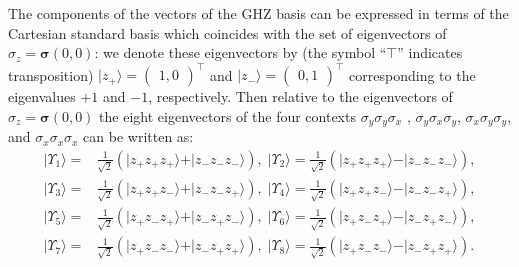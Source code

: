 \documentclass[sn-mathphys]{sn-jnl}%
\theoremstyle{thmstyleone}%
\theoremstyle{thmstyletwo}%
\theoremstyle{thmstylethree}%
\begin{document}
The components of the vectors of the GHZ basis can be expressed in terms of the Cartesian standard basis which
coincides with the set of eigenvectors of $\sigma_z = \bm{\sigma} (0,0)$:
we denote these eigenvectors by (the symbol ``$\intercal$'' indicates transposition)
$\vert z_+ \rangle =
\begin{pmatrix}1,0\end{pmatrix}^\intercal$
and
$\vert z_- \rangle  =
\begin{pmatrix}0,1\end{pmatrix}^\intercal$
corresponding to the eigenvalues $+1$ and $-1$, respectively.
Then relative to the eigenvectors of $\sigma_z = \bm{\sigma} (0,0)$
the eight eigenvectors of the four contexts
$\sigma_y \sigma_y \sigma_x$ , $\sigma_y \sigma_x \sigma_y$, $\sigma_x \sigma_y \sigma_y$, and $\sigma_x \sigma_x \sigma_x$ can be written as:
\begin{equation}
\begin{aligned}
\vert \Upsilon_1 \rangle =& \frac{1}{\sqrt{2}}\left( \vert z_+z_+z_+ \rangle  + \vert z_-z_-z_- \rangle \right) ,\;
\vert \Upsilon_2 \rangle =  \frac{1}{\sqrt{2}}\left( \vert z_+z_+z_+ \rangle  - \vert z_-z_-z_- \rangle \right) , \\
\vert \Upsilon_3 \rangle =& \frac{1}{\sqrt{2}}\left( \vert z_+z_+z_- \rangle  + \vert z_-z_-z_+ \rangle \right) , \;
\vert \Upsilon_4 \rangle =  \frac{1}{\sqrt{2}}\left( \vert z_+z_+z_- \rangle  - \vert z_-z_-z_+ \rangle \right) , \\
\vert \Upsilon_5 \rangle =& \frac{1}{\sqrt{2}}\left( \vert z_+z_-z_+ \rangle  + \vert z_-z_+z_- \rangle \right) ,\;
\vert \Upsilon_6 \rangle =  \frac{1}{\sqrt{2}}\left( \vert z_+z_-z_+ \rangle  - \vert z_-z_+z_- \rangle \right) , \\
\vert \Upsilon_7 \rangle =& \frac{1}{\sqrt{2}}\left( \vert z_+z_-z_- \rangle  + \vert z_-z_+z_+ \rangle \right) , \;
\vert \Upsilon_8 \rangle =  \frac{1}{\sqrt{2}}\left( \vert z_+z_-z_- \rangle  - \vert z_-z_+z_+ \rangle \right) .
\end{aligned}
\label{2020-ghz-evsisjsk}
\end{equation}
\end{document}

